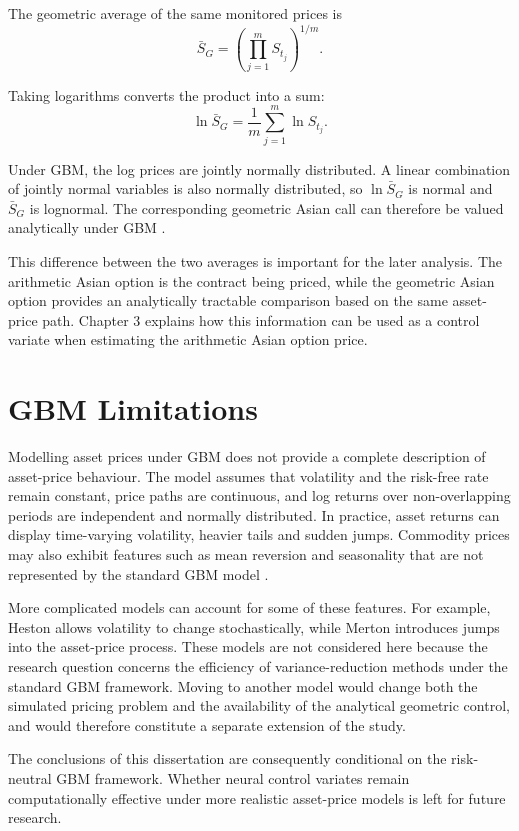 The geometric average of the same monitored prices is
\[
\bar{S}_G
=
\left(
\prod_{j=1}^{m}S_{t_j}
\right)^{1/m}.
\]

Taking logarithms converts the product into a sum:
\[
\ln\bar{S}_G
=
\frac{1}{m}
\sum_{j=1}^{m}\ln S_{t_j}.
\]

Under GBM, the log prices are jointly normally distributed. A linear combination of jointly normal variables is also normally distributed, so \(\ln\bar{S}_G\) is normal and \(\bar{S}_G\) is lognormal. The corresponding geometric Asian call can therefore be valued analytically under GBM \parencite{kemna1990}.

This difference between the two averages is important for the later analysis. The arithmetic Asian option is the contract being priced, while the geometric Asian option provides an analytically tractable comparison based on the same asset-price path. Chapter 3 explains how this information can be used as a control variate when estimating the arithmetic Asian option price.

\section{GBM Limitations}
\label{sec:gbm-limitations}

Modelling asset prices under GBM does not provide a complete description of asset-price behaviour. The model assumes that volatility and the risk-free rate remain constant, price paths are continuous, and log returns over non-overlapping periods are independent and normally distributed. In practice, asset returns can display time-varying volatility, heavier tails and sudden jumps. Commodity prices may also exhibit features such as mean reversion and seasonality that are not represented by the standard GBM model \parencite{cont2001,schwartz1997}.

More complicated models can account for some of these features. For example, Heston \parencite*{heston1993} allows volatility to change stochastically, while Merton \parencite*{merton1976} introduces jumps into the asset-price process. These models are not considered here because the research question concerns the efficiency of variance-reduction methods under the standard GBM framework. Moving to another model would change both the simulated pricing problem and the availability of the analytical geometric control, and would therefore constitute a separate extension of the study.

The conclusions of this dissertation are consequently conditional on the risk-neutral GBM framework. Whether neural control variates remain computationally effective under more realistic asset-price models is left for future research.
